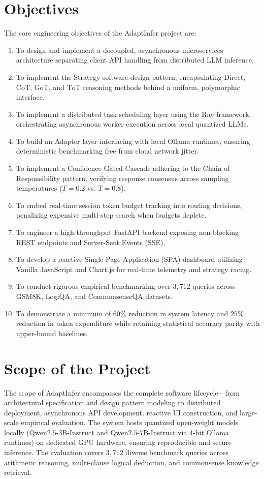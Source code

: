 \documentclass[12pt,a4paper]{report}
\begin{document}
\section{Objectives}
\label{sec:objectives}
The core engineering objectives of the AdaptInfer project are:
\begin{enumerate}[leftmargin=*]
    \item To design and implement a decoupled, asynchronous microservices architecture separating client API handling from distributed LLM inference.
    \item To implement the Strategy software design pattern, encapsulating $\text{Direct}$, $\text{CoT}$, $\text{GoT}$, and $\text{ToT}$ reasoning methods behind a uniform, polymorphic interface.
    \item To implement a distributed task scheduling layer using the Ray framework, orchestrating asynchronous worker execution across local quantized LLMs.
    \item To build an Adapter layer interfacing with local Ollama runtimes, ensuring deterministic benchmarking free from cloud network jitter.
    \item To implement a Confidence-Gated Cascade adhering to the Chain of Responsibility pattern, verifying response consensus across sampling temperatures ($T=0.2$ vs. $T=0.8$).
    \item To embed real-time session token budget tracking into routing decisions, penalizing expensive multi-step search when budgets deplete.
    \item To engineer a high-throughput FastAPI backend exposing non-blocking REST endpoints and Server-Sent Events (SSE).
    \item To develop a reactive Single-Page Application (SPA) dashboard utilizing Vanilla JavaScript and Chart.js for real-time telemetry and strategy racing.
    \item To conduct rigorous empirical benchmarking over $3,712$ queries across GSM8K, LogiQA, and CommonsenseQA datasets.
    \item To demonstrate a minimum of $60\%$ reduction in system latency and $25\%$ reduction in token expenditure while retaining statistical accuracy parity with upper-bound baselines.
\end{enumerate}

\section{Scope of the Project}
\label{sec:scope}
The scope of AdaptInfer encompasses the complete software lifecycle—from architectural specification and design pattern modeling to distributed deployment, asynchronous API development, reactive UI construction, and large-scale empirical evaluation. The system hosts quantized open-weight models locally ($\text{Qwen2.5-3B-Instruct}$ and $\text{Qwen2.5-7B-Instruct}$ via 4-bit Ollama runtimes) on dedicated GPU hardware, ensuring reproducible and secure inference. The evaluation covers $3,712$ diverse benchmark queries across arithmetic reasoning, multi-clause logical deduction, and commonsense knowledge retrieval.
\end{document}
